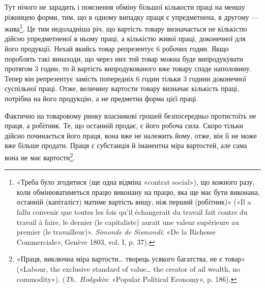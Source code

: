 
Тут нічого не зарадить і пояснення обміну більшої кількости
праці на меншу ріжницею форми, тим, що в одному випадку праця
є упредметнена, в другому — жива\footnote{
«Треба було згодитися (ще одна відміна «contrat social»), що кожного
разу, коли обмінюватиметься працю виконану на працю, яка ще
має бути виконана, останній (капіталіст) матиме вартість вищу, ніж перший
(робітник)» («Il a fallu convenir que toutes les fois qu’il échangerait du
travail fait contre du travail à faire, le dernier (le capitaliste) aurait une valeur
supérieure au premier (le travailleur)». \emph{Simonde de Sismondi}: «De
la Richesse Commerciale», Genève 1803, vol. I, p. 37).
}. Це тим недоладніша річ,
що вартість товару визначається не кількістю дійсно упредметненої
в ньому праці, а кількістю живої праці, доконечної для
його продукції. Нехай якийсь товар репрезентує 6 робочих годин.
Якщо пороблять такі винаходи, що через них той товар можна
буде випродукувати протягом 3 годин, то й вартість випродукованого
вже товару спаде наполовину. Тепер він репрезентує
замість попередніх 6 годин тільки 3 години доконечної суспільної
праці. Отже, величину вартости товару визначає кількість праці,
потрібна на його продукцію, а не предметна форма цієї праці.

Фактично на товаровому ринку власникові грошей безпосередньо
протистоїть не праця, а робітник. Те, що останній продає,
є його робоча сила. Скоро тільки дійсно починається його
праця, вона вже не належить йому, отже, він її не може вже
більше продати. Праця є субстанція й іманентна міра вартостей,
але сама вона не має вартости\footnote{
«Праця, виключна міра вартости\dots{} творець усякого багатства,
не є товар» («Labour, the exclusive standard of value\dots{} the creator of
ail wealth, no commodity»). (\emph{Th.~Hodgskin}: «Popular Political Economy»,
p. 186).
}.

